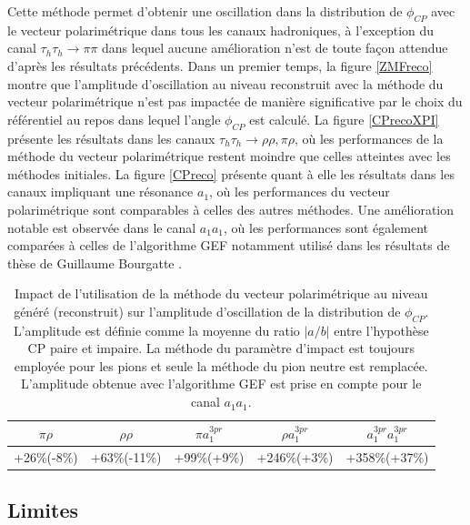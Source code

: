 Cette méthode permet d'obtenir une oscillation dans la distribution de $\phi_{CP}$ avec le vecteur polarimétrique dans tous les canaux hadroniques, à l'exception du canal $\tau_h\tau_h\rightarrow\pi\pi$ dans lequel aucune amélioration n'est de toute façon attendue d'après les résultats précédents. Dans un premier temps, la figure \ref{ZMFreco} montre que l'amplitude d'oscillation au niveau reconstruit avec la méthode du vecteur polarimétrique n'est pas impactée de manière significative par le choix du référentiel au repos dans lequel l'angle $\phi_{CP}$ est calculé. La figure \ref{CPrecoXPI} présente les résultats dans les canaux $\tau_h\tau_h\rightarrow\rho\rho,\pi\rho$, où les performances de la méthode du vecteur polarimétrique restent moindre que celles atteintes avec les méthodes initiales. La figure \ref{CPreco} présente quant à elle les résultats dans les canaux impliquant une résonance $a_1$, où les performances du vecteur polarimétrique sont comparables à celles des autres méthodes. Une amélioration notable est observée dans le canal $a_1a_1$, où les performances sont également comparées à celles de l'algorithme GEF notamment utilisé dans les résultats de thèse de Guillaume Bourgatte \cite{guigui}. \\

\begin{table}[]
\centering
\begin{tabular}{@{}ccccc@{}}
\toprule
$\pi\rho$   & $\rho\rho$   & $\pi a_1^{3pr}$ & $\rho a_1^{3pr}$ & $a_1^{3pr} a_1^{3pr}$ \\ \midrule
+26\%(-8\%) & +63\%(-11\%) & +99\%(+9\%)     & +246\%(+3\%)     & +358\%(+37\%)         \\ \bottomrule
\end{tabular}
\caption{Impact de l'utilisation de la méthode du vecteur polarimétrique au niveau généré (reconstruit) sur l'amplitude d'oscillation de la distribution de $\phi_{CP}$. L'amplitude est définie comme la moyenne du ratio $|a/b|$ entre l'hypothèse CP paire et impaire. La méthode du paramètre d'impact est toujours employée pour les pions et seule la méthode du pion neutre est remplacée. L'amplitude obtenue avec l'algorithme GEF est prise en compte pour le canal $a_1 a_1$.}
\label{recapAmp}
\end{table}

\subsection{Limites}


